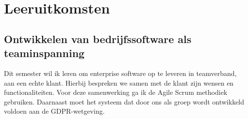 \chapter{Leeruitkomsten}
\label{ch:learning_outcomes}








\section{Ontwikkelen van bedrijfssoftware als teaminspanning}\label{sec:ontwikkelen-van-bedrijfssoftware-als-teaminspanning}



Dit semester wil ik leren om enterprise software op te leveren in teamverband, aan een echte klant.
Hierbij bespreken we samen met de klant zijn wensen en functionaliteiten.
Voor deze samenwerking ga ik de Agile Scrum methodiek gebruiken.
Daarnaast moet het systeem dat door ons als groep wordt ontwikkeld voldoen aan de GDPR-wetgeving.


